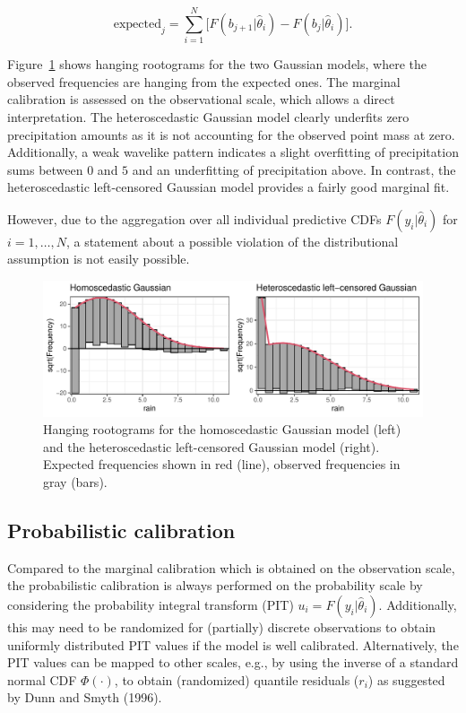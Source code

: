 \documentclass[twoside]{report}
\begin{document}
$$
\text{expected}_j = \sum_{i=1}^N \big[ F(b_{j+1} | \hat{\theta}_i) - F(b_{j} | \hat{\theta}_i) \big].
$$

Figure~\ref{stauffer:fig1} shows hanging rootograms for the two Gaussian
models, where the observed frequencies are hanging from the expected ones. The
marginal calibration is assessed on the observational scale, which allows a
direct interpretation.  The heteroscedastic Gaussian model clearly underfits
zero precipitation amounts as it is not accounting for the observed point mass
at zero. Additionally, a weak wavelike pattern indicates a slight overfitting
of precipitation sums between $0$ and $5$ and an underfitting of precipitation
above. In contrast, the heteroscedastic left-censored Gaussian model provides a
fairly good marginal fit.

However, due to the aggregation over all individual predictive CDFs
$F(y_i|\hat{\theta}_i)$ for $i = 1, \dots, N$, a statement about a
possible violation of the distributional assumption is not easily possible.

\begin{figure}[!ht]\centering
    \includegraphics[width=\textwidth]{Stauffer-rootograms}
    \caption{\label{stauffer:fig1}
        Hanging rootograms for the homoscedastic Gaussian model (left)
        and the heteroscedastic left-censored Gaussian model (right).
        Expected frequencies shown in red (line), observed frequencies
        in gray (bars).
    }
\end{figure}

\subsection{Probabilistic calibration}

Compared to the marginal calibration which is obtained on the observation
scale, the probabilistic calibration is always performed on the probability
scale by considering the probability integral transform (PIT) $u_i = F(y_i | \hat{\theta}_i)$.
Additionally, this may need to be randomized for (partially) discrete observations
to obtain uniformly distributed PIT values if the model is well calibrated.
Alternatively, the PIT values can be mapped to other scales, e.g.,
by using the inverse of a standard normal CDF $\Phi(\cdot)$, 
to obtain (randomized) quantile residuals ($r_i$) as suggested by Dunn and Smyth (1996).
\end{document}
